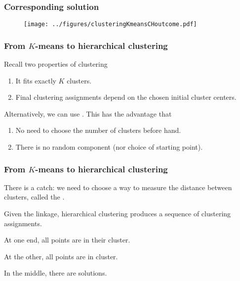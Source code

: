 \documentclass{beamer}
\begin{document}
\begin{frame}[fragile]
\frametitle{Corresponding solution}
\begin{figure}[h!]
  \centering
  \texttt{[image: ../figures/clusteringKmeansCHoutcome.pdf]}  
\end{figure}
\end{frame}

%
%

\begin{frame}
\frametitle{From $K$-means to hierarchical clustering}
Recall two properties of  clustering
\begin{enumerate}
\item It fits exactly $K$ clusters.
\item Final clustering assignments depend on the chosen initial cluster centers.
\end{enumerate}
\vsp

Alternatively, we can use .  This has the advantage that
\begin{enumerate}
\item No need to choose the number of clusters before hand.
\item There is no random component (nor choice of starting point).
\end{enumerate}
\end{frame}
\begin{frame}
\frametitle{From $K$-means to hierarchical clustering}

There is a catch: we need to choose a way to measure the distance between clusters, called the .

\vsp
Given the linkage, hierarchical clustering produces a sequence of clustering assignments.  

\vsp
At one end, all points are in their  cluster.  

\vsp
At the other, all points are in  cluster.  

\vsp
In the middle, there are  solutions.
\end{frame}
\end{document}
